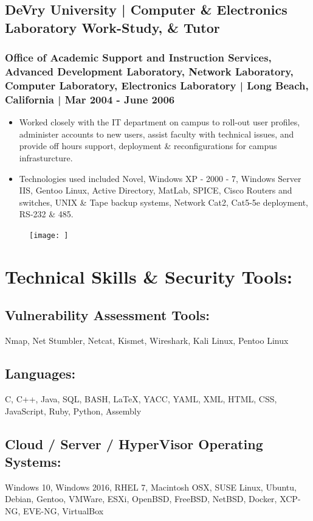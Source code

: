 \documentclass[letter,10pt]{article}
\begin{document}
\subsection*{DeVry University | Computer \& Electronics Laboratory Work-Study, \& Tutor}
\label{sec:orgd345c5c}
\subsubsection*{Office of Academic Support and Instruction Services, Advanced Development Laboratory, Network Laboratory, Computer Laboratory, Electronics Laboratory | Long Beach, California | Mar 2004 - June 2006}
\label{sec:org2252dab}
\begin{itemize}
\item Worked closely with the IT department on campus to roll-out user profiles, administer accounts to new users, assist faculty with technical issues, and provide off hours support, deployment \& reconfigurations for campus infrasturcture.
\item Technologies used included Novel, Windows XP - 2000 - 7, Windows Server IIS, Gentoo Linux, Active Directory, MatLab, SPICE, Cisco Routers and switches, UNIX \& Tape backup systems, Network Cat2, Cat5-5e deployment, RS-232 \& 485.
\end{itemize}
\begin{figure}
\texttt{[image: ]}
\end{figure}


\section*{Technical Skills \& Security Tools:}
\label{sec:orge26e30e}
\subsection*{Vulnerability Assessment Tools:}
\label{sec:org3b98176}
Nmap, Net Stumbler, Netcat, Kismet, Wireshark, Kali Linux, Pentoo Linux
\subsection*{Languages:}
\label{sec:org809db83}
C, C++, Java, SQL, BASH, \LaTeX{}, YACC, YAML, XML, HTML, CSS, JavaScript, Ruby, Python, Assembly
\subsection*{Cloud / Server / HyperVisor Operating Systems:}
\label{sec:org50d77cc}
Windows 10, Windows 2016, RHEL 7, Macintosh OSX, SUSE Linux, Ubuntu, Debian, Gentoo, VMWare, ESXi, OpenBSD, FreeBSD, NetBSD, Docker, XCP-NG, EVE-NG, VirtualBox
\end{document}
